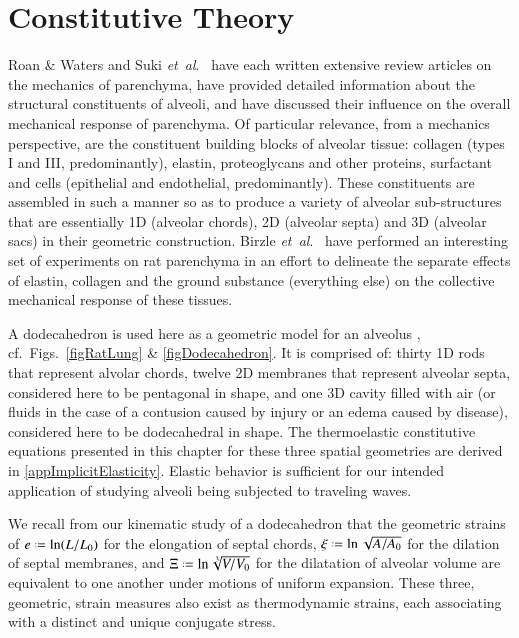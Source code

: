 \part{Constitutive Theory}
\label{partConstitutive}

Roan \& Waters \cite{RoanWaters11} and Suki \textit{et~al}.\ \cite{Sukietal05,Sukietal11} have each written extensive review articles on the mechanics of parenchyma, have provided detailed information about the structural constituents of alveoli, and have discussed their influence on the overall mechanical response of parenchyma.  Of particular relevance, from a mechanics perspective, are the constituent building blocks of alveolar tissue: collagen (types I and III, predominantly), elastin, proteoglycans and other proteins, surfactant and cells (epithelial and endothelial, predominantly).  These constituents are assembled in such a manner so as to produce a variety of alveolar sub-structures that are essentially 1D (alveolar chords), 2D (alveolar septa) and 3D (alveolar sacs) in their geometric construction.  Birzle \textit{et~al}.\ \cite{Birzleetal19} have performed an interesting set of experiments on rat parenchyma in an effort to delineate the separate effects of elastin, collagen and the ground substance (everything else) on the collective mechanical response of these tissues.

A dodecahedron is used here as a geometric model for an alveolus \cite{FrankusLee74}, cf.\ Figs.~\ref{figRatLung} \& \ref{figDodecahedron}.  It is comprised of: thirty 1D rods that represent alvolar chords, twelve 2D membranes that represent alveolar septa, considered here to be pentagonal in shape, and one 3D cavity filled with air (or fluids in the case of a contusion caused by injury or an edema caused by disease), considered here to be dodecahedral in shape.  The thermo\-elastic constitutive equations presented in this chapter for these three spatial geometries are derived in \ref{appImplicitElasticity}.  Elastic behavior is sufficient for our intended application of studying alveoli being subjected to traveling waves.

We recall from our kinematic study of a dodecahedron that the geometric strains of $e \defeq \ln ( L / L_0 )$ for the elongation of septal chords, $\xi \defeq \ln \sqrt{A / A_0}$ for the dilation of septal membranes, and $\Xi \defeq \ln \sqrt[3]{V / V_0}$ for the dilatation of alveolar volume are equivalent to one another under motions of uniform expansion.  These three, geometric, strain measures also exist as thermo\-dynamic strains, each associating with a distinct and unique conjugate stress.

